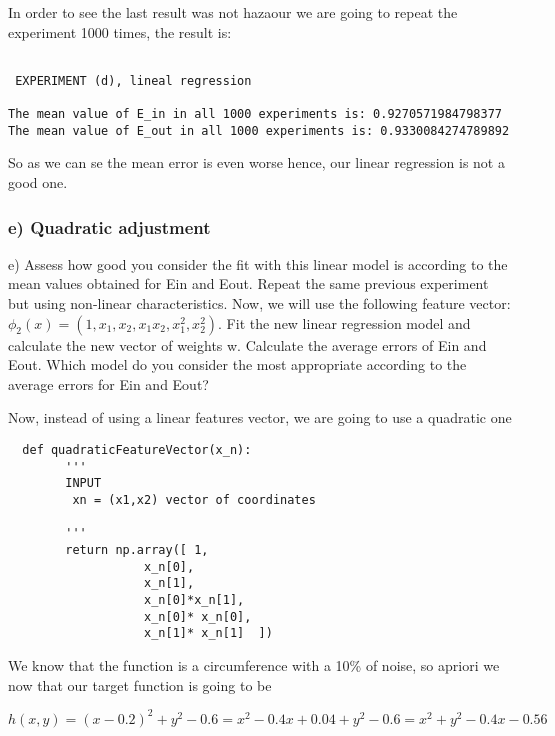 In order to see the last result was not hazaour we are going to repeat the experiment 1000 times, the result is:

\begin{verbatim}

 EXPERIMENT (d), lineal regression

The mean value of E_in in all 1000 experiments is: 0.9270571984798377
The mean value of E_out in all 1000 experiments is: 0.9330084274789892

\end{verbatim}


So as we can se the mean error is even worse hence, our linear regression is not a good one.

\subsubsection{e) Quadratic adjustment}

e) Assess how good you consider the fit with this linear model is according to the mean values obtained for Ein and Eout. Repeat the same previous experiment but using non-linear characteristics. Now, we will use the following feature vector: $\phi_2(x) =(1,x_1,x_2,x_1 x_2, x_1^2, x_2^2)$. Fit the new linear regression model and calculate the new vector of weights w. Calculate the average errors of Ein and Eout. Which model do you consider the most appropriate according to the average errors for Ein and Eout?



Now, instead of using a linear features vector, we are going to use a quadratic one

\begin{verbatim}
  def quadraticFeatureVector(x_n):
        '''
        INPUT 
         xn = (x1,x2) vector of coordinates 
        
        '''
        return np.array([ 1,
                   x_n[0],
                   x_n[1],
                   x_n[0]*x_n[1],
                   x_n[0]* x_n[0],
                   x_n[1]* x_n[1]  ])

                 \end{verbatim}

                 We know that the function is a circumference with a 10\% of noise, so apriori we now that our target function is going to be

               
                 $$h(x,y) = (x-0.2)^2 + y^2 -0.6 = x^2 - 0.4x + 0.04 + y^2 - 0.6 = x^2 + y^2 - 0.4x - 0.56$$

